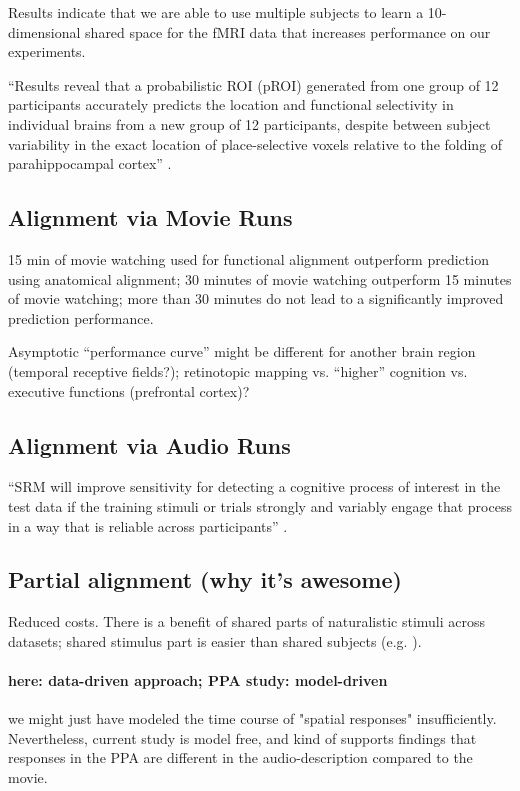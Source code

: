 %
Results indicate that we are able to use multiple subjects to learn a
10-dimensional shared space for the fMRI data that increases performance on our
experiments.

%
``Results reveal that a probabilistic ROI (pROI) generated from one group of 12
participants accurately predicts the location and functional selectivity in
individual brains from a new group of 12 participants, despite between subject
variability in the exact location of place-selective voxels relative to the
folding of parahippocampal cortex'' \citep{weiner2018defining}.


\subsection{Alignment via Movie Runs}

%
15 min of movie watching used for functional alignment outperform prediction
using anatomical alignment;
%
30 minutes of movie watching outperform 15 minutes of movie watching;
%
more than 30 minutes do not lead to a significantly improved prediction
performance.

%
Asymptotic ``performance curve'' might be different for another brain region
(temporal receptive fields?); retinotopic mapping vs. ``higher'' cognition  vs.
executive functions (prefrontal cortex)?


\subsection{Alignment via Audio Runs}

``SRM will improve sensitivity for detecting a cognitive process of interest in
the test data if the training stimuli or trials strongly and variably engage
that process in a way that is reliable across participants''
\citep{cohen2017computational}.


\subsection{Partial alignment (why it's awesome)}

%
Reduced costs.
%
There is a benefit of shared parts of naturalistic stimuli across datasets;
shared stimulus part is easier than shared subjects (e.g.
\citep{zhang2018transfer}).


\paragraph{here: data-driven approach; PPA study: model-driven}
%
we might just have modeled the time course of "spatial responses"
insufficiently.
%
Nevertheless, current study is model free, and kind of supports findings that
responses in the PPA are different in the audio-description compared to the
movie.



